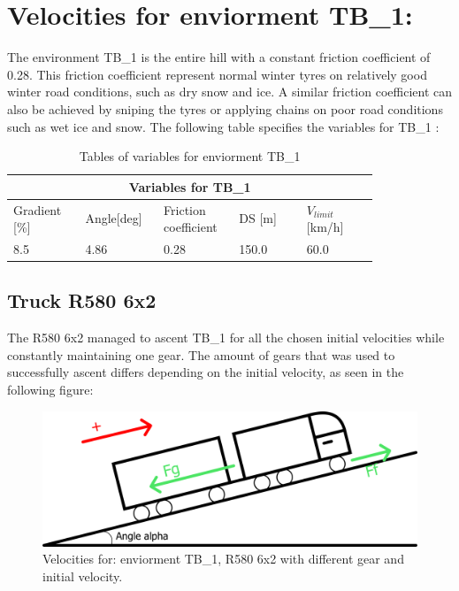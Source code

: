 \documentclass[noprint]{uit-thesis}
\begin{document}
\section{Velocities for enviorment TB\_1:}
The environment TB\_1 is the entire hill with a constant friction coefficient of 0.28. This friction coefficient represent normal winter tyres on relatively good winter road conditions, such as dry snow and ice. A similar friction coefficient can also be achieved by sniping the tyres or applying chains on poor road conditions such as wet ice and snow. The following table specifies the variables for TB\_1 :
\renewcommand{\arraystretch}{1.2}
\begin{table}[H]
\center
\begin{tabular}{|p{0.17\linewidth} | p{0.16\linewidth} | p{0.16\linewidth} | p{0.16\linewidth} | p{0.17\linewidth} |} 

 \hline
\multicolumn{5}{|c|}{\textbf{Variables for TB\_1}} \\
 \hline 
Gradient [\%]  & Angle[deg]  & \makecell[l]{Friction\\coefficient} & DS [m]  & $V_{limit}$[km/h]  \\
\hline
8.5 & 4.86 & 0.28 & 150.0 & 60.0 \\
 \hline
\end{tabular}
\caption{Tables of variables for enviorment TB\_1}
\label{tab:TB1}
\end{table}

\subsection{Truck R580 6x2}
The R580 6x2 managed to ascent TB\_1 for all the chosen initial velocities while constantly maintaining one gear. The amount of gears that was used to successfully ascent differs depending on the initial velocity, as seen in the following figure:

\begin{figure}[H]
\includegraphics[width=\textwidth, height=0.37\textheight]{photo/freeBodyDiagram.png}
\caption{Velocities for: enviorment TB\_1, R580 6x2 with different gear and initial velocity.}
\label{fig:TB1_6x2}
\end{figure}
\end{document}
